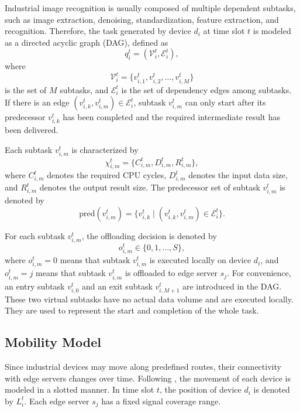 \documentclass[conference]{IEEEtran}
\begin{document}
Industrial image recognition is usually composed of multiple dependent subtasks, such as image extraction, denoising, standardization, feature extraction, and recognition. Therefore, the task generated by device $d_i$ at time slot $t$ is modeled as a directed acyclic graph (DAG), defined as
\begin{equation}
q_i^t=(\mathcal{V}_i^t,\mathcal{E}_i^t),
\end{equation}
where
\begin{equation}
\mathcal{V}_i^t=\{v_{i,1}^t,v_{i,2}^t,\ldots,v_{i,M}^t\}
\end{equation}
is the set of $M$ subtasks, and $\mathcal{E}_i^t$ is the set of dependency edges among subtasks. If there is an edge $(v_{i,k}^t,v_{i,m}^t)\in \mathcal{E}_i^t$, subtask $v_{i,m}^t$ can only start after its predecessor $v_{i,k}^t$ has been completed and the required intermediate result has been delivered.

Each subtask $v_{i,m}^t$ is characterized by
\begin{equation}
\chi_{i,m}^t=\{C_{i,m}^t,D_{i,m}^t,R_{i,m}^t\},
\end{equation}
where $C_{i,m}^t$ denotes the required CPU cycles, $D_{i,m}^t$ denotes the input data size, and $R_{i,m}^t$ denotes the output result size. The predecessor set of subtask $v_{i,m}^t$ is denoted by
\begin{equation}
\mathrm{pred}(v_{i,m}^t)
=
\{v_{i,k}^t \mid (v_{i,k}^t,v_{i,m}^t)\in \mathcal{E}_i^t\}.
\end{equation}

For each subtask $v_{i,m}^t$, the offloading decision is denoted by
\begin{equation}
o_{i,m}^t \in \{0,1,\ldots,S\},
\end{equation}
where $o_{i,m}^t=0$ means that subtask $v_{i,m}^t$ is executed locally on device $d_i$, and $o_{i,m}^t=j$ means that subtask $v_{i,m}^t$ is offloaded to edge server $s_j$. For convenience, an entry subtask $v_{i,0}^t$ and an exit subtask $v_{i,M+1}^t$ are introduced in the DAG. These two virtual subtasks have no actual data volume and are executed locally. They are used to represent the start and completion of the whole task.

\subsection{Mobility Model}

Since industrial devices may move along predefined routes, their connectivity with edge servers changes over time. Following \cite{10892268}, the movement of each device is modeled in a slotted manner. In time slot $t$, the position of device $d_i$ is denoted by $L_i^t$. Each edge server $s_j$ has a fixed signal coverage range.
\end{document}
